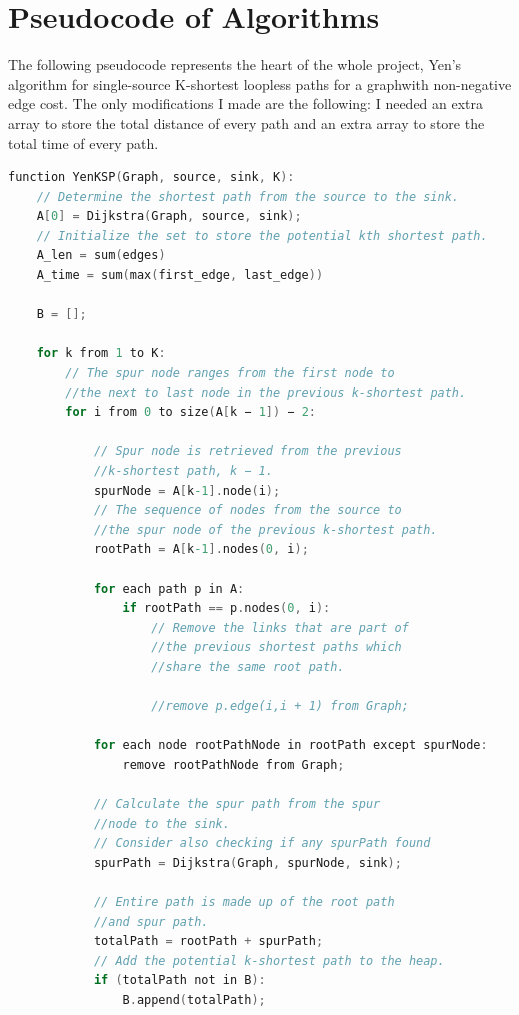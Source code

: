 \documentclass[12pt]{article}
\begin{document}
\section{Pseudocode of Algorithms}\label{sec_ps}
The following pseudocode represents the heart of the whole project, Yen's algorithm for single-source K-shortest loopless paths for a graphwith non-negative edge cost. The only modifications I made are the following: I needed an extra array to store the total distance of every path and an extra array to store the total time of every path.
\newline
\begin{lstlisting}[language=C]
function YenKSP(Graph, source, sink, K):
    // Determine the shortest path from the source to the sink.
    A[0] = Dijkstra(Graph, source, sink);
    // Initialize the set to store the potential kth shortest path.
    A_len = sum(edges)
    A_time = sum(max(first_edge, last_edge))
    
    B = [];
    
    for k from 1 to K:
        // The spur node ranges from the first node to 
        //the next to last node in the previous k-shortest path.
        for i from 0 to size(A[k − 1]) − 2:
            
            // Spur node is retrieved from the previous 
            //k-shortest path, k − 1.
            spurNode = A[k-1].node(i);
            // The sequence of nodes from the source to 
            //the spur node of the previous k-shortest path.
            rootPath = A[k-1].nodes(0, i);
            
            for each path p in A:
                if rootPath == p.nodes(0, i):
                    // Remove the links that are part of 
                    //the previous shortest paths which 
                    //share the same root path.
                    
                    //remove p.edge(i,i + 1) from Graph;
            
            for each node rootPathNode in rootPath except spurNode:
                remove rootPathNode from Graph;
            
            // Calculate the spur path from the spur 
            //node to the sink.
            // Consider also checking if any spurPath found
            spurPath = Dijkstra(Graph, spurNode, sink);
            
            // Entire path is made up of the root path 
            //and spur path.
            totalPath = rootPath + spurPath;
            // Add the potential k-shortest path to the heap.
            if (totalPath not in B):
                B.append(totalPath);
            

\end{lstlisting}
\end{document}
